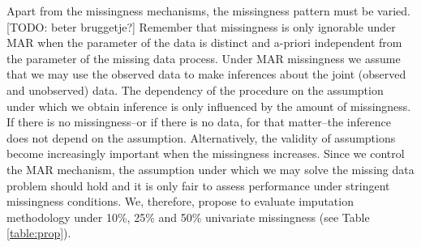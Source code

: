 \documentclass[bimj,fleqn]{w-art}
\begin{document}
Apart from the missingness mechanisms, the missingness pattern must be varied. [TODO: beter bruggetje?] Remember that missingness is only ignorable under MAR when the parameter of the data is distinct and a-priori independent from the parameter of the missing data process. Under MAR missingness we assume that we may use the observed data to make inferences about the joint (observed and unobserved) data. The dependency of the procedure on the assumption under which we obtain inference is only influenced by the amount of missingness. If there is no missingness--or if there is no data, for that matter--the inference does not depend on the assumption. Alternatively, the validity of assumptions become increasingly important when the missingness increases. Since we control the MAR mechanism, the assumption under which we may solve the missing data problem should hold and it is only fair to assess performance under stringent missingness conditions. We, therefore, propose to evaluate imputation methodology under 10\%, 25\% and 50\% univariate missingness (see Table \ref{table:prop}). %
\end{document}

